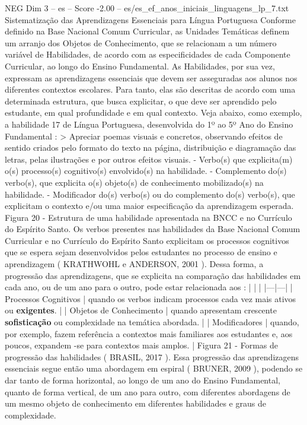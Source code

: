 \begin{textsample}{NEG Dim 3 – es – Score -2.00 – es/es\_ef\_anos\_iniciais\_linguagens\_lp\_7.txt}  \label{ex:f3_neg_172}
Sistematização das Aprendizagens Essenciais para Língua Portuguesa Conforme definido na Base Nacional Comum Curricular, as Unidades Temáticas definem um arranjo dos Objetos de Conhecimento, que se relacionam a um número variável de Habilidades, de acordo com as especificidades de cada Componente Curricular, ao longo do Ensino Fundamental.
As Habilidades, por sua vez, expressam as aprendizagens essenciais que devem ser asseguradas aos alunos nos diferentes contextos escolares.
Para tanto, elas são descritas de acordo com uma determinada estrutura, que busca explicitar, o que deve ser aprendido pelo estudante, em qual profundidade e em qual contexto.
Veja abaixo, como exemplo, a habilidade 17 de Língua Portuguesa, desenvolvida do 1º ao 5º Ano do Ensino Fundamental : > Apreciar poemas visuais e concretos, observando efeitos de sentido criados pelo formato do texto na página, distribuição e diagramação das letras, pelas ilustrações e por outros efeitos visuais. - Verbo(s) que explicita(m) o(s) processo(s) cognitivo(s) envolvido(s) na habilidade. - Complemento do(s) verbo(s), que explicita o(s) objeto(s) de conhecimento mobilizado(s) na habilidade. - Modificador do(s) verbo(s) ou do complemento do(s) verbo(s), que explicitam o contexto e/ou uma maior especificação da aprendizagem esperada.
Figura 20 - Estrutura de uma habilidade apresentada na BNCC e no Currículo do Espírito Santo.
Os verbos presentes nas habilidades da Base Nacional Comum Curricular e no Currículo do Espírito Santo explicitam os processos cognitivos que se espera sejam desenvolvidos pelos estudantes no processo de ensino e aprendizagem ( KRATHWOHL e ANDERSON, 2001 ).
Dessa forma, a progressão das aprendizagens, que se explicita na comparação das habilidades em cada ano, ou de um ano para o outro, pode estar relacionada aos : | | | |---|---| | Processos Cognitivos | quando os verbos indicam processos cada vez mais ativos ou \textbf{exigentes}. | | Objetos de Conhecimento | quando apresentam crescente \textbf{sofisticação} ou complexidade na temática abordada. | | Modificadores | quando, por exemplo, fazem referência a contextos mais familiares aos estudantes e, aos poucos, expandem -se para contextos mais amplos. | Figura 21 - Formas de progressão das habilidades ( BRASIL, 2017 ).
Essa progressão das aprendizagens essenciais segue então uma abordagem em espiral ( BRUNER, 2009 ), podendo se dar tanto de forma horizontal, ao longo de um ano do Ensino Fundamental, quanto de forma vertical, de um ano para outro, com diferentes abordagens de um mesmo objeto de conhecimento em diferentes habilidades e graus de complexidade.

\end{textsample}
